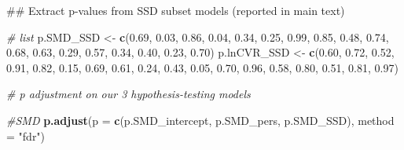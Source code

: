 \documentclass[]{article}
\newenvironment{Shaded}{\begin{snugshade}}{\end{snugshade}}
\newcommand{\KeywordTok}[1]{\textcolor[rgb]{0.13,0.29,0.53}{\textbf{#1}}}
\newcommand{\DataTypeTok}[1]{\textcolor[rgb]{0.13,0.29,0.53}{#1}}
\newcommand{\FloatTok}[1]{\textcolor[rgb]{0.00,0.00,0.81}{#1}}
\newcommand{\StringTok}[1]{\textcolor[rgb]{0.31,0.60,0.02}{#1}}
\newcommand{\CommentTok}[1]{\textcolor[rgb]{0.56,0.35,0.01}{\textit{#1}}}
\newcommand{\NormalTok}[1]{#1}
\begin{document}
\begin{Shaded}
\begin{Highlighting}[]
\NormalTok{## Extract p-values from SSD subset models (reported in main text)}

\CommentTok{# list}
\NormalTok{  p.SMD_SSD <-}\StringTok{ }\KeywordTok{c}\NormalTok{(}\FloatTok{0.69}\NormalTok{, }\FloatTok{0.03}\NormalTok{, }\FloatTok{0.86}\NormalTok{, }\FloatTok{0.04}\NormalTok{, }\FloatTok{0.34}\NormalTok{, }\FloatTok{0.25}\NormalTok{, }\FloatTok{0.99}\NormalTok{, }\FloatTok{0.85}\NormalTok{, }\FloatTok{0.48}\NormalTok{, }\FloatTok{0.74}\NormalTok{, }\FloatTok{0.68}\NormalTok{, }\FloatTok{0.63}\NormalTok{, }\FloatTok{0.29}\NormalTok{, }\FloatTok{0.57}\NormalTok{, }\FloatTok{0.34}\NormalTok{, }\FloatTok{0.40}\NormalTok{, }\FloatTok{0.23}\NormalTok{, }\FloatTok{0.70}\NormalTok{)}
\NormalTok{  p.lnCVR_SSD <-}\StringTok{ }\KeywordTok{c}\NormalTok{(}\FloatTok{0.60}\NormalTok{, }\FloatTok{0.72}\NormalTok{, }\FloatTok{0.52}\NormalTok{, }\FloatTok{0.91}\NormalTok{, }\FloatTok{0.82}\NormalTok{, }\FloatTok{0.15}\NormalTok{, }\FloatTok{0.69}\NormalTok{, }\FloatTok{0.61}\NormalTok{, }\FloatTok{0.24}\NormalTok{, }\FloatTok{0.43}\NormalTok{, }\FloatTok{0.05}\NormalTok{, }\FloatTok{0.70}\NormalTok{, }\FloatTok{0.96}\NormalTok{, }\FloatTok{0.58}\NormalTok{, }\FloatTok{0.80}\NormalTok{, }\FloatTok{0.51}\NormalTok{, }\FloatTok{0.81}\NormalTok{, }\FloatTok{0.97}\NormalTok{)}
  
  \CommentTok{# p adjustment on our 3 hypothesis-testing models}
  
    \CommentTok{#SMD}
  \KeywordTok{p.adjust}\NormalTok{(}\DataTypeTok{p =} \KeywordTok{c}\NormalTok{(p.SMD_intercept, p.SMD_pers, p.SMD_SSD), }\DataTypeTok{method =} \StringTok{"fdr"}\NormalTok{) }
\end{Highlighting}
\end{Shaded}
\end{document}
